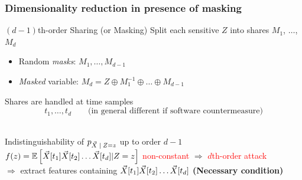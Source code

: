 



\begin{frame}
\frametitle{Dimensionality reduction in presence of masking}
\begin{block}{$(d-1)$th-order Sharing (or Masking)} 
Split each sensitive $Z$ into shares  $M_1$, $\dots$, $M_d$ 
\begin{itemize}
\item Random \emph{masks}: $M_1, \dots , M_{d-1}$  
\item \emph{Masked} variable: $M_d = Z \oplus M_1^{-1}\oplus \dots \oplus M_{d-1}$
\end{itemize}
Shares are handled at time samples $$t_1,\dots, t_d \qquad \text{(in general different if software countermeasure)} $$
\\
\end{block}

\begin{block}{Indistinguishability of $\pdf_{\given{\vaLeakVec}{\sensRandVar=\sensVar}}$  up to order $d-1$}
\pause
\textcolor{red}{$f(z) = \mathbb{E}\left[\vec{X}[t_1]\vec{X}[t_2]\dots\vec{X}[t_d]\lvert Z=z\right]$ non-constant} $\Rightarrow$ \textcolor{red}{$d$th-order attack} \\
\pause
$\Rightarrow$ extract features containing $\vec{X}[t_1]\vec{X}[t_2]\dots\vec{X}[t_d]$ \textbf{(Necessary condition)}
\end{block}

\end{frame}



